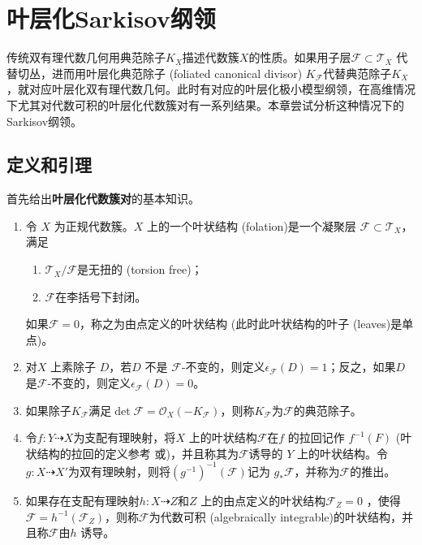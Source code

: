 \chapter{叶层化Sarkisov纲领}
传统双有理代数几何用典范除子$K_{X}$描述代数簇$X$的性质。如果用子层$\mathcal{F} \subset \mathcal{T}_{X}$ 代替切丛，进而用叶层化典范除子 (foliated canonical divisor) $K_{\mathcal{F}}$代替典范除子$K_{X}$，就对应叶层化双有理代数几何。此时有对应的叶层化极小模型纲领，在高维情况下尤其对代数可积的叶层化代数簇对有一系列结果。本章尝试分析这种情况下的Sarkisov纲领。
\section{定义和引理}
首先给出\textbf{叶层化代数簇对}的基本知识。

\begin{definition}[叶状结构]\cite[Definition 2.3-6]{acc_foliation}
  \begin{enumerate}
    \item 令 $X$ 为正规代数簇。$X$ 上的一个叶状结构 (folation)是一个凝聚层 $\mathcal{F} \subset \mathcal{T}_{X}$，满足
          \begin{enumerate}
            \item $\mathcal{T}_{X}/\mathcal{F}$是无扭的 (torsion free)；
            \item $\mathcal{F}$在李括号下封闭。 
          \end{enumerate}
          如果$\mathcal{F}=0$，称之为由点定义的叶状结构 (此时此叶状结构的叶子 (leaves)是单点)。
    \item 对$X$ 上素除子 $D$，若$D$ 不是 $\mathcal{F}$-不变的，则定义$\epsilon_{\mathcal{F}}(D)=1 $；反之，如果$D$ 是$\mathcal{F}$-不变的，则定义$\epsilon_{\mathcal{F}}(D)=0$。
    \item 如果除子$K_{\mathcal{F}}$满足$\det \mathcal{F} = \mathcal{O}_{X}(-K_{\mathcal{F}})$，则称$K_{\mathcal{F}}$为$\mathcal{F}$的典范除子。
    \item 令$f:Y \dashrightarrow X$为支配有理映射，将$X$ 上的叶状结构$\mathcal{F}$在$f$ 的拉回记作  $ f^{-1}(F) $ (叶状结构的拉回的定义参考\cite[3.1]{acss} 或\cite[3.2]{cs21})，并且称其为$\mathcal{F}$诱导的 $Y$ 上的叶状结构。令$g:X \dashrightarrow X' $为双有理映射，则将$(g^{-1})^{-1}(\mathcal{F})$记为 $g_{*}\mathcal{F}$，并称为$\mathcal{F}$的推出。
    \item 如果存在支配有理映射$h:X \dashrightarrow  Z$和$Z$ 上的由点定义的叶状结构$\mathcal{F}_{Z}=0$  ，使得  $\mathcal{F}=h^{-1}(\mathcal{F}_{Z})$，则称$\mathcal{F}$为代数可积 (algebraically integrable)的叶状结构，并且称$\mathcal{F}$由$h$ 诱导。 
  \end{enumerate}
\end{definition}
